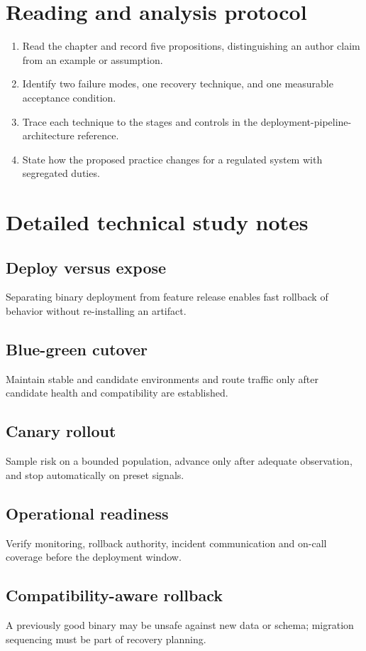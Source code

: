 \documentclass[10pt,letterpaper]{article}
\begin{document}
\section{Reading and analysis protocol}
\begin{enumerate}
\item Read the chapter and record five propositions, distinguishing an author claim from an example or assumption.
\item Identify two failure modes, one recovery technique, and one measurable acceptance condition.
\item Trace each technique to the stages and controls in the deployment-pipeline-architecture reference.
\item State how the proposed practice changes for a regulated system with segregated duties.
\end{enumerate}

\section{Detailed technical study notes}
\subsection{Deploy versus expose}
Separating binary deployment from feature release enables fast rollback of behavior without re-installing an artifact.

\subsection{Blue-green cutover}
Maintain stable and candidate environments and route traffic only after candidate health and compatibility are established.

\subsection{Canary rollout}
Sample risk on a bounded population, advance only after adequate observation, and stop automatically on preset signals.

\subsection{Operational readiness}
Verify monitoring, rollback authority, incident communication and on-call coverage before the deployment window.

\subsection{Compatibility-aware rollback}
A previously good binary may be unsafe against new data or schema; migration sequencing must be part of recovery planning.
\end{document}
